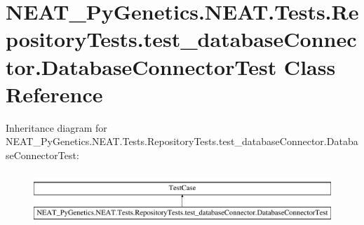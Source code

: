 \hypertarget{class_n_e_a_t___py_genetics_1_1_n_e_a_t_1_1_tests_1_1_repository_tests_1_1test__database_connector_1_1_database_connector_test}{}\section{N\+E\+A\+T\+\_\+\+Py\+Genetics.\+N\+E\+A\+T.\+Tests.\+Repository\+Tests.\+test\+\_\+database\+Connector.\+Database\+Connector\+Test Class Reference}
\label{class_n_e_a_t___py_genetics_1_1_n_e_a_t_1_1_tests_1_1_repository_tests_1_1test__database_connector_1_1_database_connector_test}
Inheritance diagram for N\+E\+A\+T\+\_\+\+Py\+Genetics.\+N\+E\+A\+T.\+Tests.\+Repository\+Tests.\+test\+\_\+database\+Connector.\+Database\+Connector\+Test\+:\begin{figure}[H]
\begin{center}
\leavevmode
\includegraphics[height=1.978799cm]{class_n_e_a_t___py_genetics_1_1_n_e_a_t_1_1_tests_1_1_repository_tests_1_1test__database_connector_1_1_database_connector_test}
\end{center}
\end{figure}
